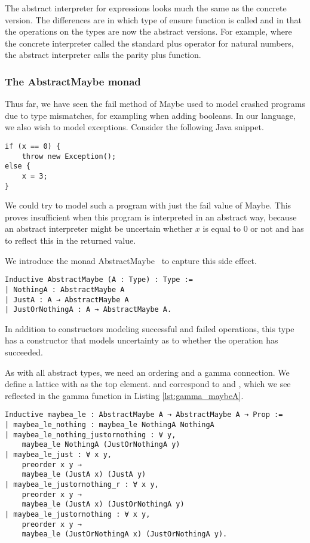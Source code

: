 The abstract interpreter for expressions looks much the same as the concrete
version. The differences are in which type of ensure function is called and in
that the operations on the types are now the abstract versions. For example,
where the concrete interpreter called the standard plus operator for natural
numbers, the abstract interpreter calls the parity plus function.

\subsubsection{The AbstractMaybe monad}
Thus far, we have seen the fail method of Maybe used to model crashed programs
due to type mismatches, for exampling when adding booleans. In our language, we
also wish to model exceptions. Consider the following Java snippet.

\begin{verbatim}
if (x == 0) {
    throw new Exception();
else {
    x = 3;
}
\end{verbatim}

We could try to model such a program with just the fail value of Maybe. 
This proves insufficient when this program is interpreted in an abstract way, 
because an abstract interpreter might be uncertain whether $x$ is equal to 
$0$ or not and has to reflect this in the returned value.

We introduce the monad AbstractMaybe~\cite{keidel2018compositional} 
to capture this side effect.

\begin{verbatim}
Inductive AbstractMaybe (A : Type) : Type :=
| NothingA : AbstractMaybe A
| JustA : A → AbstractMaybe A
| JustOrNothingA : A → AbstractMaybe A.
\end{verbatim}

In addition to constructors modeling successful and failed operations, this
type has a constructor that models uncertainty as to whether the operation has
succeeded.

As with all abstract types, we need an ordering and a gamma connection. We
define a lattice with  as the top element.  and
 correspond to  and , which we see reflected
in the gamma function in Listing \ref{lst:gamma_maybeA}.

\begin{listing}
\begin{verbatim}
Inductive maybea_le : AbstractMaybe A → AbstractMaybe A → Prop :=
| maybea_le_nothing : maybea_le NothingA NothingA
| maybea_le_nothing_justornothing : ∀ y, 
    maybea_le NothingA (JustOrNothingA y)
| maybea_le_just : ∀ x y, 
    preorder x y → 
    maybea_le (JustA x) (JustA y)
| maybea_le_justornothing_r : ∀ x y, 
    preorder x y →
    maybea_le (JustA x) (JustOrNothingA y)
| maybea_le_justornothing : ∀ x y, 
    preorder x y →
    maybea_le (JustOrNothingA x) (JustOrNothingA y).
\end{verbatim}
\end{listing}

